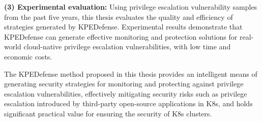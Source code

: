 \begin{EnglishAbstract}
\textbf{(3) Experimental evaluation:} Using privilege escalation vulnerability samples from the past five years, this thesis evaluates the quality and efficiency of strategies generated by KPEDefense. Experimental results demonstrate that KPEDefense can generate effective monitoring and protection solutions for real-world cloud-native privilege escalation vulnerabilities, with low time and economic costs.

The KPEDefense method proposed in this thesis provides an intelligent means of generating security strategies for monitoring and protecting against privilege escalation vulnerabilities, effectively mitigating security risks such as privilege escalation introduced by third-party open-source applications in K8s, and holds significant practical value for ensuring the security of K8s clusters.

\end{EnglishAbstract}
